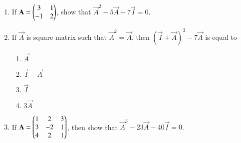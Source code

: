 \begin{enumerate}[label=\thesubsection.\arabic*,ref=\thesubsection.\theenumi]
\item If $\mathbf{A}=\begin{pmatrix}3 & 1\\ -1 & 2\end{pmatrix}$, show that $\vec{A}^2-5\vec{A}+7\vec{I}=0$.
\item If $\vec{A}$ is square matrix such that $\vec{A}^2=\vec{A}$, then $(\vec{I}+\vec{A})^3-7\vec{A}$ is equal to
\begin{enumerate}
\item $\vec{A}$
\item $\vec{I}-\vec{A}$
\item $\vec{I}$
\item $3\vec{A}$
\end{enumerate}
\item If $\mathbf{A}=\begin{pmatrix}1&2&3\\3&-2&1\\4&2&1\end{pmatrix}$, then show that $\vec{A}^3-23\vec{A}-40\vec{I}=0$.
\end{enumerate}
